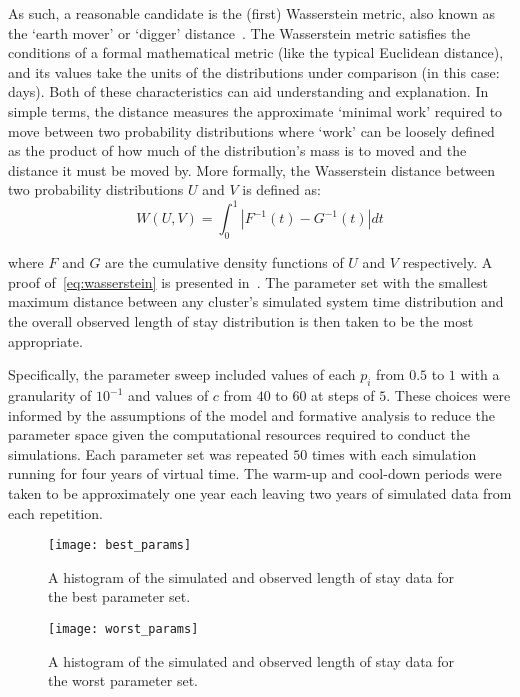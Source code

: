 As such, a reasonable candidate is the (first) Wasserstein metric, also known as
the `earth mover' or `digger' distance~\cite{Vaserstein1969}. The Wasserstein
metric satisfies the conditions of a formal mathematical metric (like the
typical Euclidean distance), and its values take the units of the distributions
under comparison (in this case: days). Both of these characteristics can aid
understanding and explanation. In simple terms, the distance measures the
approximate `minimal work' required to move between two probability
distributions where `work' can be loosely defined as the product of how much of
the distribution's mass is to moved and the distance it must be moved
by. More formally, the Wasserstein distance between two probability
distributions \(U\) and \(V\) is defined as:
\begin{equation}\label{eq:wasserstein}
    W(U, V) = \int_{0}^{1} \left\vert F^{-1}(t) - G^{-1}(t) \right\vert dt
\end{equation}

\noindent where \(F\) and \(G\) are the cumulative density functions of \(U\)
and \(V\) respectively. A proof of~\eqref{eq:wasserstein} is presented
in~\cite{Ramdas2017}. The parameter set with the smallest maximum distance
between any cluster's simulated system time distribution and the overall
observed length of stay distribution is then taken to be the most appropriate.

Specifically, the parameter sweep included values of each \(p_i\) from \(0.5\)
to \(1\) with a granularity of \(10^{-1}\) and values of \(c\) from \(40\) to
\(60\) at steps of \(5\). These choices were informed by the assumptions of the
model and formative analysis to reduce the parameter space given the
computational resources required to conduct the simulations. Each parameter set
was repeated \(50\) times with each simulation running for four years of virtual
time. The warm-up and cool-down periods were taken to be approximately one year
each leaving two years of simulated data from each repetition.

\begin{figure}
    \centering%
    \texttt{[image: best\_params]}
    \caption{A histogram of the simulated and observed length of stay data for
             the best parameter set.}\label{fig:best_params}
\end{figure}

\begin{figure}
    \centering%
    \texttt{[image: worst\_params]}
    \caption{A histogram of the simulated and observed length of stay data for
             the worst parameter set.}\label{fig:worst_params}
\end{figure}

